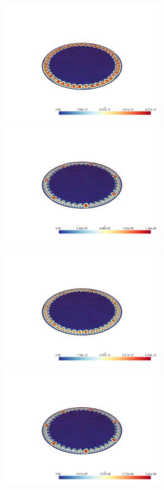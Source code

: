\documentclass[
  11pt,
]{article}
\let\origfigure\figure
\let\endorigfigure\endfigure
\renewenvironment{figure}[1][2] {
    \expandafter\origfigure\expandafter[H]
} {
    \endorigfigure
}
\begin{document}
\begin{figure}
\caption{Finite element error in the L2 and H1 norms/seminorms, respectively for problem 1 over mesh number 2 using order 19 quadrature.}
\end{figure}

\includegraphics[width=0.5\textwidth,height=\textheight]{../img/mesh3-gauss02-L2.png}
\includegraphics[width=0.5\textwidth,height=\textheight]{../img/mesh3-gauss02-H1.png}

\begin{figure}
\caption{Finite element error in the L2 and H1 norms/seminorms, respectively for problem 1 over mesh number 3 using order 2 quadrature.}
\end{figure}

\includegraphics[width=0.5\textwidth,height=\textheight]{../img/mesh3-gauss05-L2.png}
\includegraphics[width=0.5\textwidth,height=\textheight]{../img/mesh3-gauss05-H1.png}
\end{document}
